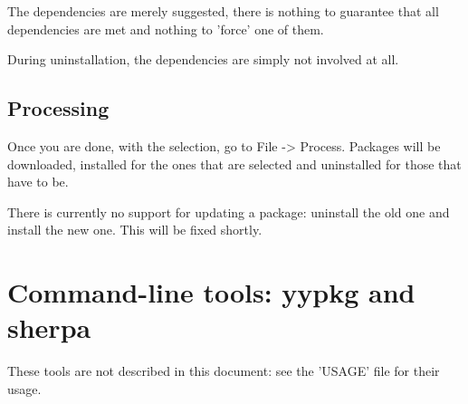 \documentclass[a4paper]{article}
\begin{document}
The dependencies are merely suggested, there is nothing to guarantee that all dependencies are met and nothing to 'force' one of them.

During uninstallation, the dependencies are simply not involved at all.

\subsection{Processing}
Once you are done, with the selection, go to File -> Process. Packages will be downloaded, installed for the ones that are selected and uninstalled for those that have to be.

There is currently no support for updating a package: uninstall the old one and install the new one. This will be fixed shortly.

\section{Command-line tools: yypkg and sherpa}
These tools are not described in this document: see the 'USAGE' file for their usage.
\end{document}

